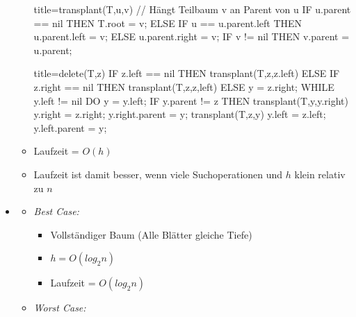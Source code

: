\documentclass[
    12pt,
    a4paper,
    ngerman,
    color=3b,%
    marginpar=false,
    colorback=false,
    leqno,
]{tudaexercise}
\begin{document}
\begin{itemize}
\begin{itemize}
\begin{ccode}[autogobble]{title={transplant(T,u,v) // Hängt Teilbaum v an Parent von u}}
                            IF u.parent == nil THEN
                                T.root = v;
                            ELSE
                                IF u == u.parent.left THEN
                                    u.parent.left = v;
                                ELSE
                                    u.parent.right = v;
                            IF v != nil THEN
                                v.parent = u.parent;
                        \end{ccode}
                        \begin{ccode}[autogobble]{title={delete(T,z)}}
                            IF z.left == nil THEN
                                transplant(T,z,z.left)
                            ELSE
                                IF z.right == nil THEN
                                    transplant(T,z,z,left)
                                ELSE
                                    y = z.right;
                                    WHILE y.left != nil DO y = y.left;
                                    IF y.parent != z THEN
                                        transplant(T,y,y.right)
                                        y.right = z.right;
                                        y.right.parent = y;
                                    transplant(T,z,y)
                                    y.left = z.left;
                                    y.left.parent = y;
                        \end{ccode}
              \item Laufzeit = $O(h)$
              \item Laufzeit ist damit besser, wenn viele Suchoperationen und $h$ klein relativ zu $n$
          \end{itemize}
\clearpage
    \item {}
          \begin{itemize}
              \item \textit{Best Case:}
                    \begin{itemize}
                        \item Vollständiger Baum (Alle Blätter gleiche Tiefe)
                        \item $h = O(log_2 n)$
                        \item Laufzeit = $O(log_2 n)$
                    \end{itemize}
              \item \textit{Worst Case:}
                    \begin{itemize}

\end{itemize}
\end{itemize}
\end{itemize}
\end{document}
